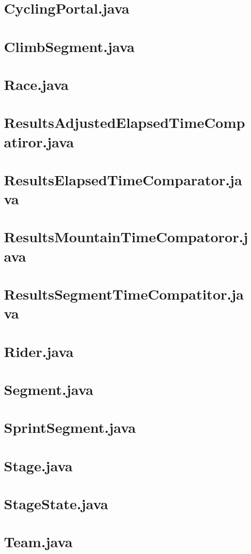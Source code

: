 \documentclass{article}
\begin{document}
\section{CyclingPortal.java}


\section{ClimbSegment.java}


\section{Race.java}


\section{ResultsAdjustedElapsedTimeCompatiror.java}


\section{ResultsElapsedTimeComparator.java}


\section{ResultsMountainTimeCompatoror.java}


\section{ResultsSegmentTimeCompatitor.java}


\section{Rider.java}


\section{Segment.java}


\section{SprintSegment.java}


\section{Stage.java}


\section{StageState.java}


\section{Team.java}

\end{document}
